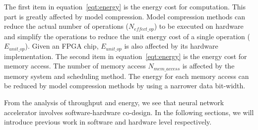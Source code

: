 The first item in equation~\ref{eqt:energy} is the energy cost for computation. This part is greatly affected by model compression. Model compression methods can reduce the actual number of operations ($N_{effect\_op}$) to be executed on hardware and simplify the operations to reduce the unit energy cost of a single operation ($E_{unit\_op}$). Given an FPGA chip, $E_{unit\_op}$ is also affected by its hardware implementation. The second item in equation~\ref{eqt:energy} is the energy cost for memory access. The number of memory access $N_{mem\_access}$ is affected by the memory system and scheduling method. The energy for each memory access can be reduced by model compression methods by using a narrower data bit-width. 

From the analysis of throughput and energy, we see that neural network accelerator involves software-hardware co-design. In the following sections, we will introduce previous work in software and hardware level respectively. 
